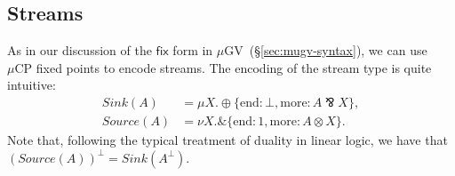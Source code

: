 \documentclass[orivec,envcountsame]{llncs}
\newcommand{\with}{\mathbin\binampersand}
\newcommand{\parr}{\mathbin\bindnasrepma}
\newcommand{\cpdual}[1]{#1^\perp}
\newcommand{\mkwd}[1]{\mathsf{#1}}
\newcommand{\clabel}[1]{\mathrm{#1}}
\newcommand{\lrkwd}{\mkwd{fix}}
\newcommand{\mucp}{$\mu\mathrm{CP}$\xspace}
\newcommand{\mugv}{$\mu\mathrm{GV}$\xspace}
\newcommand{\secref}[1]{(\S\ref{sec:#1})}
\begin{document}
\subsection{Streams}

As in our discussion of the $\lrkwd$ form in \mugv~\secref{mugv-syntax}, we can use \mucp fixed
points to encode streams.  The encoding of the stream type is quite intuitive:
\begin{align*}
  Sink(A) &= \mu X. \oplus \{ \clabel{end}: \bot, \clabel{more}: A \parr X \}, \\
  Source(A) &= \nu X. \with \{ \clabel{end}: 1, \clabel{more}: A \otimes X \}.
\end{align*}
Note that, following the typical treatment of duality in linear logic, we have that
$\cpdual{(Source(A))} = Sink(\cpdual{A})$.
\end{document}
